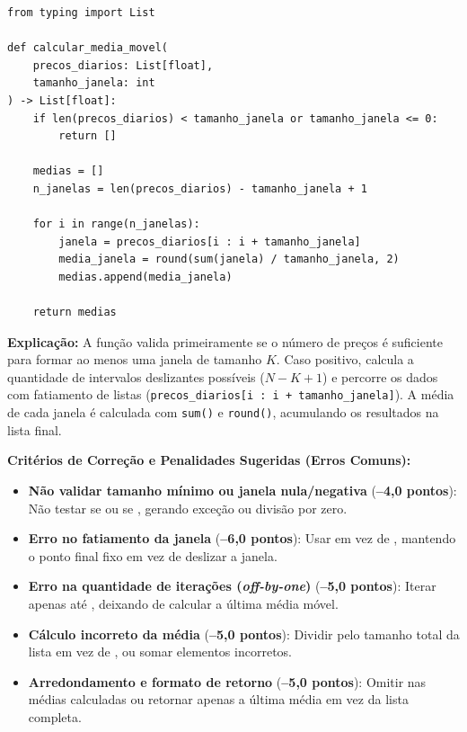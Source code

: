 \ifmostrarGabarito
\begin{verbatim}
from typing import List

def calcular_media_movel(
    precos_diarios: List[float], 
    tamanho_janela: int
) -> List[float]:
    if len(precos_diarios) < tamanho_janela or tamanho_janela <= 0:
        return []
        
    medias = []
    n_janelas = len(precos_diarios) - tamanho_janela + 1
    
    for i in range(n_janelas):
        janela = precos_diarios[i : i + tamanho_janela]
        media_janela = round(sum(janela) / tamanho_janela, 2)
        medias.append(media_janela)
        
    return medias
\end{verbatim}

\textbf{Explicação:}
A função valida primeiramente se o número de preços é suficiente para formar ao menos uma janela de tamanho $K$. Caso positivo, calcula a quantidade de intervalos deslizantes possíveis ($N - K + 1$) e percorre os dados com fatiamento de listas (\texttt{precos\_diarios[i : i + tamanho\_janela]}). A média de cada janela é calculada com \texttt{sum()} e \texttt{round()}, acumulando os resultados na lista final.

\vspace{0.3cm}
\textbf{Critérios de Correção e Penalidades Sugeridas (Erros Comuns):}
\begin{itemize}[leftmargin=*, noitemsep, topsep=2pt]
    \item \textbf{Não validar tamanho mínimo ou janela nula/negativa} (\textbf{--4,0 pontos}): Não testar se  ou se , gerando exceção ou divisão por zero.
    \item \textbf{Erro no fatiamento da janela} (\textbf{--6,0 pontos}): Usar  em vez de , mantendo o ponto final fixo em vez de deslizar a janela.
    \item \textbf{Erro na quantidade de iterações (\emph{off-by-one})} (\textbf{--5,0 pontos}): Iterar apenas até , deixando de calcular a última média móvel.
    \item \textbf{Cálculo incorreto da média} (\textbf{--5,0 pontos}): Dividir pelo tamanho total da lista em vez de , ou somar elementos incorretos.
    \item \textbf{Arredondamento e formato de retorno} (\textbf{--5,0 pontos}): Omitir  nas médias calculadas ou retornar apenas a última média em vez da lista completa.
\end{itemize}
\else
{}
\clearpage
{}
\clearpage
\fi
